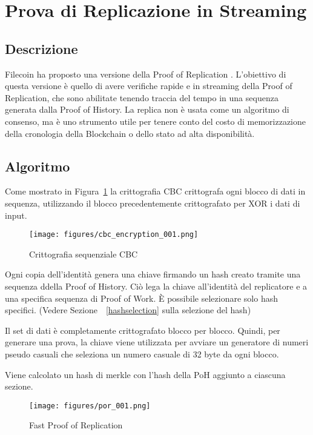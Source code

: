 \documentclass[12pt]{article}
\begin{document}
\section{Prova di Replicazione in Streaming}\label{porep}
\subsection{Descrizione}
Filecoin ha proposto una versione della Proof of Replication \cite{filecoinporep}. L'obiettivo di questa versione è quello di avere verifiche rapide e in streaming della Proof of Replication, che sono abilitate tenendo traccia del tempo in una sequenza generata dalla Proof of History. La replica non è usata come un algoritmo di consenso, ma è uno strumento utile per tenere conto del costo di memorizzazione della cronologia della Blockchain o dello stato ad alta disponibilità.
\subsection{Algoritmo}
Come mostrato in Figura~\ref{fig:encrypt} la crittografia CBC crittografa ogni blocco di dati in sequenza, utilizzando il blocco precedentemente crittografato per XOR i dati di input.

\begin{figure}[h]
  \begin{center}
    \centering
    \texttt{[image: figures/cbc\_encryption\_001.png]}
    \caption[Fig 7]{Crittografia sequenziale CBC\label{fig:encrypt}}
  \end{center}
  \end{figure}

Ogni copia dell'identità genera una chiave firmando un hash creato tramite una sequenza ddella Proof of History. Ciò lega la chiave all'identità del replicatore e a una specifica sequenza di Proof of Work. È possibile selezionare solo hash specifici. (Vedere Sezione ~\ref{hashselection} sulla selezione del hash)

Il set di dati è completamente crittografato blocco per blocco. Quindi, per generare una prova, la chiave viene utilizzata per avviare un generatore di numeri pseudo casuali che seleziona un numero casuale di 32 byte da ogni blocco.

Viene calcolato un hash di merkle con l'hash della PoH aggiunto a ciascuna sezione.

\begin{figure}[h]
  \begin{center}
    \centering
    \texttt{[image: figures/por\_001.png]}
    \caption[Fig 8]{Fast Proof of Replication\label{fig_8}}
  \end{center}
  \end{figure}
\end{document}
